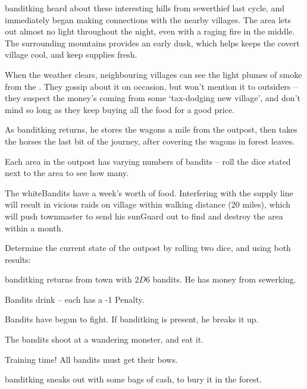 \begin{multicols}{2}

\begin{exampletext}
  \noindent
  \Gls{banditking} heard about these interesting hills from \gls{sewerthief} last \gls{cycle}, and immediately began making connections with the nearby \glspl{village}.
  The area lets out almost no light throughout the night, even with a raging fire in the middle.
  The surrounding mountains provides an early dusk, which helps keeps the covert \gls{village} cool, and keep supplies fresh.
\end{exampletext}

When the weather clears, neighbouring \glspl{village} can see the light plumes of smoke from the .
They gossip about it on occasion, but won't mention it to outsiders -- they suspect the money's coming from some `tax-dodging new \gls{village}', and don't mind so long as they keep buying all the food for a good price.

As \gls{banditking} returns, he stores the wagons a mile from the outpost, then takes the horses the last bit of the journey, after covering the wagons in forest leaves.

Each area in the outpost has varying numbers of bandits -- roll the dice stated next to the area to see how many.

The \gls{whiteBandits} have a week's worth of food.
Interfering with the supply line will result in vicious raids on \gls{village} within walking distance (20 miles), which will push \gls{townmaster} to send his \gls{sunGuard} out to find and destroy the area within a month.

Determine the current state of the outpost by rolling two dice, and using both results:

\begin{dlist}
  \item
  \Gls{banditking} returns from \gls{town} with $2D6$ bandits.
  He has money from \gls{sewerking}.
  \item
  Bandits drink -- each has a -1 Penalty.
  \item
  Bandits have begun to fight.
  If \gls{banditking} is present, he breaks it up.
  \item
  The bandits shoot at a wandering monster, and eat it.
  \item
  Training time!
  All bandits must get their bows.
  \item
  \Gls{banditking} sneaks out with some bags of cash, to bury it in the forest.
\end{dlist}

\end{multicols}

